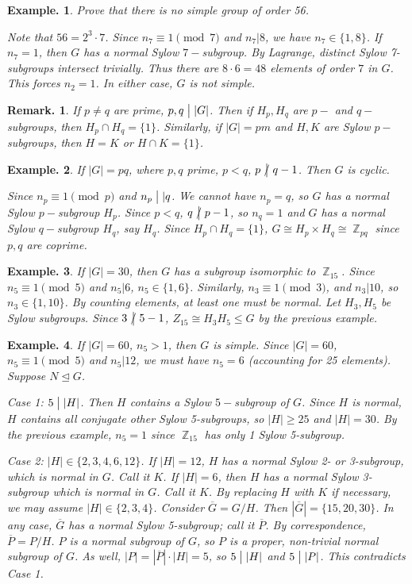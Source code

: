 \documentclass[11pt, a4paper]{memoir}
\DeclareMathOperator{\Z}{{\mathbb{Z}}}
\renewcommand{\div}{\bigm|}
\newcommand{\ndiv}{%
    \mathrel{\mkern.5mu %
        \ooalign{\hidewidth$\big|$\hidewidth\cr$/$\cr}%
    }%
}
\theoremstyle{change}
\theoremstyle{plain}
\theoremstyle{nonumberplain}
\newtheorem{example}{Example.}
\newtheorem{remark}{Remark.}
\numberwithin{equation}{section}
\begin{document}
\begin{example}
    Prove that there is no simple group of order 56.

    Note that $56=2^3\cdot 7$.
    Since $n_7\equiv 1\pmod{7}$ and $n_7|8$, we have $n_7\in\{1,8\}$.
    If $n_7=1$, then $G$ has a normal Sylow $7-$subgroup.
    By Lagrange, distinct Sylow 7-subgroups intersect trivially.
    Thus there are $8\cdot 6=48$ elements of order $7$ in $G$.
    This forces $n_2=1$.
    In either case, $G$ is not simple.
\end{example}
\begin{remark}
    If $p\neq q$ are prime, $p,q\div|G|$.
    Then if $H_p,H_q$ are $p-$ and $q-$subgroups, then $H_p\cap H_q=\{1\}$.
    Similarly, if $|G|=pm$ and $H,K$ are Sylow $p-$subgroups, then $H=K$ or $H\cap K=\{1\}$.
\end{remark}
\begin{example}
    If $|G|=pq$, where $p,q$ prime, $p<q$, $p\ndiv q-1$.
    Then $G$ is cyclic.

    Since $n_p\equiv 1\pmod{p}$ and $n_p\div|q$.
    We cannot have $n_p=q$, so $G$ has a normal Sylow $p-$subgroup $H_p$.
    Since $p<q$, $q\ndiv p-1$, so $n_q=1$ and $G$ has a normal Sylow $q-$subgroup $H_q$, say $H_q$.
    Since $H_p\cap H_q=\{1\}$, $G\cong H_p\times H_q\cong\Z_{pq}$ since $p,q$ are coprime.
\end{example}
\begin{example}
    If $|G|=30$, then $G$ has a subgroup isomorphic to $\Z_{15}$.
    Since $n_5\equiv 1\pmod{5}$ and $n_5|6$, $n_5\in\{1,6\}$.
    Similarly, $n_3\equiv 1\pmod{3}$, and $n_3|10$, so $n_3\in\{1,10\}$.
    By counting elements, at least one must be normal.
    Let $H_3,H_5$ be Sylow subgroups.
    Since $3\ndiv 5-1$, $Z_{15}\cong H_3H_5\leq G$ by the previous example.
\end{example}
\begin{example}
    If $|G|=60$, $n_5>1$, then $G$ is simple.
    Since $|G|=60$, $n_5\equiv 1\pmod{5}$ and $n_5|12$, we must have $n_5=6$ (accounting for 25 elements).
    Suppose $N\trianglelefteq G$.

    Case 1: $5\div|H|$.
    Then $H$ contains a Sylow $5-$subgroup of $G$.
    Since $H$ is normal, $H$ contains all conjugate other Sylow 5-subgroups, so $|H|\geq 25$ and $|H|=30$.
    By the previous example, $n_5=1$ since $\Z_{15}$ has only 1 Sylow 5-subgroup.

    Case 2: $|H|\in\{2,3,4,6,12\}$.
    If $|H|=12$, $H$ has a normal Sylow 2- or 3-subgroup, which is normal in $G$.
    Call it $K$.
    If $|H|=6$, then $H$ has a normal Sylow 3-subgroup which is normal in $G$.
    Call it $K$.
    By replacing $H$ with $K$ if necessary, we may assume $|H|\in\{2,3,4\}$.
    Consider $\overline{G}=G/H$.
    Then $|\overline{G}|=\{15,20,30\}$.
    In any case, $\overline{G}$ has a normal Sylow 5-subgroup; call it $\overline{P}$.
    By correspondence, $\overline{P}=P/H$.
    $P$ is a normal subgroup of $G$, so $P$ is a proper, non-trivial normal subgroup of $G$.
    As well, $|P|=|\overline{P}|\cdot|H|=5$, so $5\div|H|$ and $5\div|P|$.
    This contradicts Case 1.
\end{example}
\end{document}
